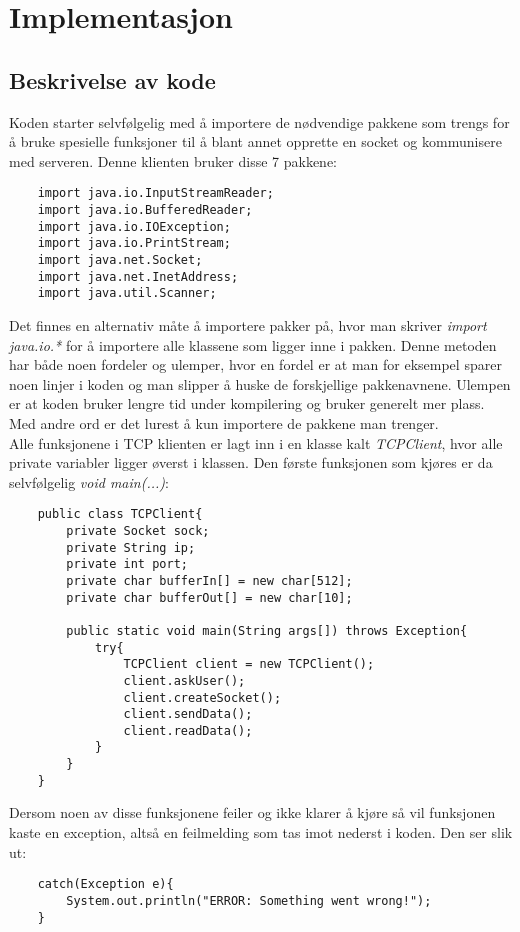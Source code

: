 \section{Implementasjon}
\subsection{Beskrivelse av kode}
Koden starter selvfølgelig med å importere de nødvendige pakkene som trengs for å bruke spesielle funksjoner til å blant annet opprette en socket og kommunisere med serveren. Denne klienten bruker disse 7 pakkene:
\begin{lstlisting}
	import java.io.InputStreamReader;
	import java.io.BufferedReader;
	import java.io.IOException;
	import java.io.PrintStream;
	import java.net.Socket;
	import java.net.InetAddress;
	import java.util.Scanner;
\end{lstlisting}

Det finnes en alternativ måte å importere pakker på, hvor man skriver \textit{import java.io.*} for å importere alle klassene som ligger inne i pakken. Denne metoden har både noen fordeler og ulemper, hvor en fordel er at man for eksempel sparer noen linjer i koden og man slipper å huske de forskjellige pakkenavnene. Ulempen er at koden bruker lengre tid under kompilering og bruker generelt mer plass. Med andre ord er det lurest å kun importere de pakkene man trenger.\\

Alle funksjonene i TCP klienten er lagt inn i en klasse kalt \textit{TCPClient}, hvor alle private variabler ligger øverst i klassen. Den første funksjonen som kjøres er da selvfølgelig \textit{void main(...)}:
\begin{lstlisting}
	public class TCPClient{
		private Socket sock;
		private String ip;
		private int port;
		private char bufferIn[] = new char[512];
		private char bufferOut[] = new char[10];
		
		public static void main(String args[]) throws Exception{
			try{
				TCPClient client = new TCPClient();
				client.askUser();
				client.createSocket();
				client.sendData();
				client.readData();
			}
		}
	}
\end{lstlisting}

Dersom noen av disse funksjonene feiler og ikke klarer å kjøre så vil funksjonen kaste en exception, altså en feilmelding som tas imot nederst i koden. Den ser slik ut:
\begin{lstlisting}
	catch(Exception e){
		System.out.println("ERROR: Something went wrong!");
	}
\end{lstlisting}

